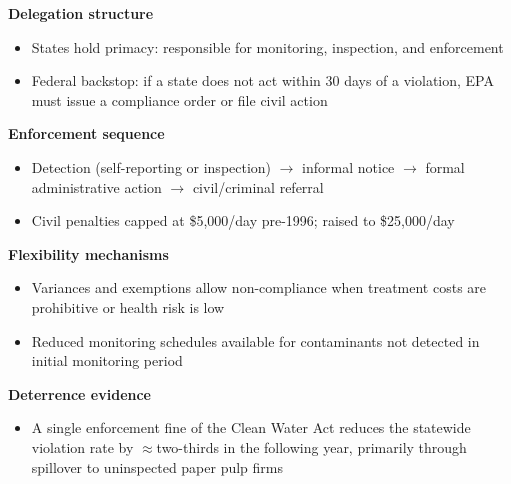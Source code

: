 \documentclass{beamer}
\begin{document}
\begin{frame}
\textbf{Delegation structure}
\begin{itemize}
  \item States hold primacy: responsible for monitoring, inspection, and enforcement
  \item Federal backstop: if a state does not act within 30 days of a violation, EPA must issue a compliance order or file civil action
\end{itemize}

\medskip
\textbf{Enforcement sequence}
\begin{itemize}
  \item Detection (self-reporting or inspection) $\to$ informal notice $\to$ formal administrative action $\to$ civil/criminal referral
  \item Civil penalties capped at \$5,000/day pre-1996; raised to \$25,000/day
\end{itemize}

\medskip
\textbf{Flexibility mechanisms}
\begin{itemize}
  \item Variances and exemptions allow non-compliance when treatment costs are prohibitive or health risk is low
  \item Reduced monitoring schedules available for contaminants not detected in initial monitoring period
\end{itemize}

\medskip
\textbf{Deterrence evidence}
\begin{itemize}
  \item A single enforcement fine of the Clean Water Act reduces the statewide violation rate by $\approx$two-thirds in the following year, primarily through spillover to uninspected paper pulp firms \citep{shimshack2005regulator}
\end{itemize}
\end{frame}
\end{document}
